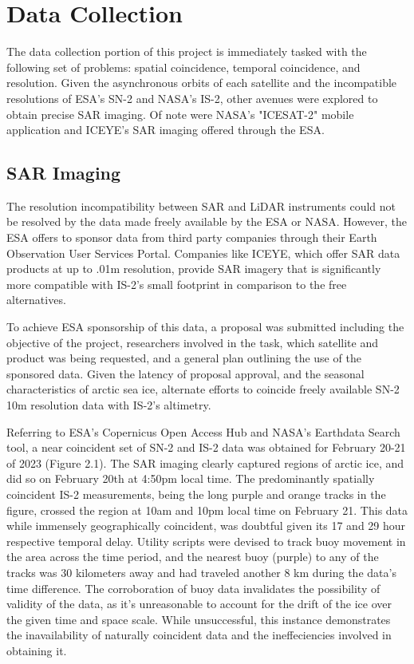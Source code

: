 \chapter{Data Collection}
\label{sec:Data_Collection}

The data collection portion of this project is immediately tasked with the following set of problems: spatial coincidence, temporal coincidence, and resolution. Given the asynchronous orbits of each satellite and the incompatible resolutions of ESA's SN-2 and NASA's IS-2, other avenues were explored to obtain precise SAR imaging. Of note were NASA's "ICESAT-2" mobile application and ICEYE's\textsuperscript{\tiny\textcopyright} SAR imaging offered through the ESA.

\section {SAR Imaging}
The resolution incompatibility between SAR and LiDAR instruments could not be resolved by the data made freely available by the ESA or NASA. However, the ESA offers to sponsor data from third party companies through their Earth Observation User Services Portal. Companies like ICEYE, which offer SAR data products at up to .01m resolution, provide SAR imagery that is significantly more compatible with IS-2's small footprint in comparison to the free alternatives.

To achieve ESA sponsorship of this data, a proposal was submitted including the objective of the project, researchers involved in the task, which satellite and product was being requested, and a general plan outlining the use of the sponsored data. Given the latency of proposal approval, and the seasonal characteristics of arctic sea ice, alternate efforts to coincide freely available SN-2 10m resolution data with IS-2's altimetry.

Referring to ESA's Copernicus Open Access Hub and NASA's Earthdata Search tool, a near coincident set of SN-2 and IS-2 data was obtained for February 20-21 of 2023 (Figure 2.1). The SAR imaging clearly captured regions of arctic ice, and did so on February 20th at 4:50pm local time. The predominantly spatially coincident IS-2 measurements, being the long purple and orange tracks in the figure, crossed the region at 10am and 10pm local time on February 21. This data while immensely geographically coincident, was doubtful given its 17 and 29 hour respective temporal delay. Utility scripts were devised to track buoy movement in the area across the time period, and the nearest buoy (purple) to any of the tracks was 30 kilometers away and had traveled another 8 km during the data's time difference. The corroboration of buoy data invalidates the possibility of validity of the data, as it's unreasonable to account for the drift of the ice over the given time and space scale. While unsuccessful, this instance demonstrates the inavailability of naturally coincident data and the ineffeciencies involved in obtaining it.


